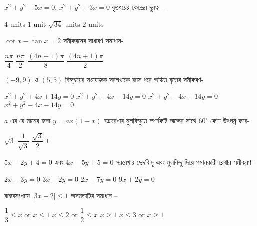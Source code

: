 \documentclass[addpoints]{exam}
\begin{document}
\begin{questions}
\question  $ x^{2}+y^{2}-5x=0,\,  x^{2}+y^{2}+3x=0  $ বৃত্তদ্বয়ের কেন্দ্রের দুরত্ব – 

\begin{oneparchoices}
\choice $ 4 $ units
\choice $ 1 $ unit
\choice $ \sqrt{34} $ units
\choice $ 2 $ units
\end{oneparchoices}

\question  $ \cot x -\tan x =2 $ সমীকরনের সাধারণ সমাধান- 

\begin{oneparchoices}
\choice $ \dfrac{n\pi}{4} $
\choice $ \dfrac{n\pi}{2} $
\choice $ \dfrac{(4n+1)\pi}{8} $
\choice $ \dfrac{(4n+1)\pi}{2} $
\end{oneparchoices}



\question $ (-9,9) $ ও $ (5,5) $ বিন্দুদ্বয়ের সংযোজক সরলখাকে ব্যাস ধরে অঙ্কিত বৃত্তের সমীকরণ- 

\begin{oneparchoices}
\choice $ x^{2}+y^{2}+4x+14y=0 $
\choice $ x^{2}+y^{2}+4x-14y=0 $
\choice $ x^{2}+y^{2}-4x+14y=0 $
\choice $ x^{2}+y^{2}-4x-14y=0 $
\end{oneparchoices}

\question  $ a $ এর যে মানের জন্য $ y=ax(1-x) $ বক্ররেখার মুলবিন্দুতে স্পর্শকটি অক্ষের সাথে $ 60^{\circ} $ কোণ উৎপন্ন করে- 

\begin{oneparchoices}
\choice $ \sqrt{3} $
\choice $ \dfrac{1}{\sqrt{3}} $
\choice $ \dfrac{\sqrt{3}}{2} $
\choice $ 1 $
\end{oneparchoices}

\question $ 5x-2y+4=0 $ এবং $ 4x-5y+5=0 $ সররেখার ছেদবিন্দু এবং মুলবিন্দু দিয়ে গমানকারী রেখার সমীকরণ-

\begin{oneparchoices}
\choice $ 2x-3y=0 $
\choice $ 3x-2y=0 $
\choice $ 2x-7y=0 $
\choice $ 9x+2y=0 $

\end{oneparchoices}

\question বাস্তবসংখ্যায় $ |3x-2|\le 1 $ অসমতাটির সমাধান – 

\begin{oneparchoices}
\choice $ \dfrac{1}{3}\le x$ or $x\le 1$
\choice $ x \le 2$ or $\dfrac{1}{2}\le x$
\choice $ x\ge 1$
\choice $x\le 3$ or $x\ge 1 $
\end{oneparchoices}
\end{questions}
\end{document}
